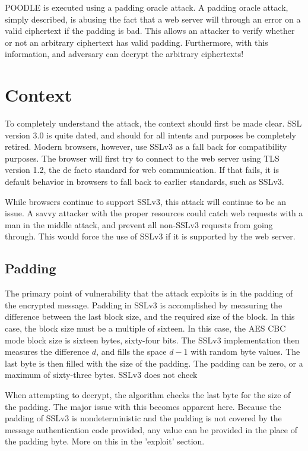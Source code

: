 \documentclass[10pt]{article}
\begin{document}
POODLE is executed using a padding oracle attack. A padding oracle attack, simply
described, is abusing the fact that a web server will through an error on a valid
ciphertext if the padding is bad. This allows an attacker to verify whether or
not an arbitrary ciphertext has valid padding. Furthermore, with this information,
and adversary can decrypt the arbitrary ciphertexts!\cite{rosulek}

\section*{Context}
To completely understand the attack, the context should first be made clear. 
SSL version 3.0 is quite dated, and should for all intents and purposes be 
completely retired. Modern browsers, however, use SSLv3 as a fall back for
compatibility purposes. The browser will first try to connect to the web server
using TLS version 1.2, the de facto standard for web communication. If that fails,
it is default behavior in browsers to fall back to earlier standards, such as SSLv3.\cite{POODLE}

While browsers continue to support SSLv3, this attack will continue to be an
issue. A savvy attacker with the proper resources could catch web requests with
a man in the middle attack, and prevent all non-SSLv3 requests from going through.
This would force the use of SSLv3 if it is supported by the web server.\cite{MozillaPOODLE} 

\subsection*{Padding}
The primary point of vulnerability that the attack exploits is in the padding
of the encrypted message. Padding in SSLv3 is accomplished by measuring the 
difference between the last block size, and the required size of the block. In
this case, the block size must be a multiple of sixteen. In this case, the AES
CBC mode block size is sixteen bytes, sixty-four bits. The SSLv3 implementation
then measures the difference $d$, and fills the space $d-1$ with random byte
values. The last byte is then filled with the size of the padding. The padding
can be zero, or a maximum of sixty-three bytes.\cite{SSLv3}
SSLv3 does not check 

When attempting to decrypt, the algorithm checks the last byte for the size of
the padding. The major issue with this becomes apparent here. Because the padding
of SSLv3 is nondeterministic and the padding is not covered by the message
authentication code provided, any value can be provided in the place of the
padding byte.\cite{POODLE} More on this in the 'exploit' section.
\end{document}
